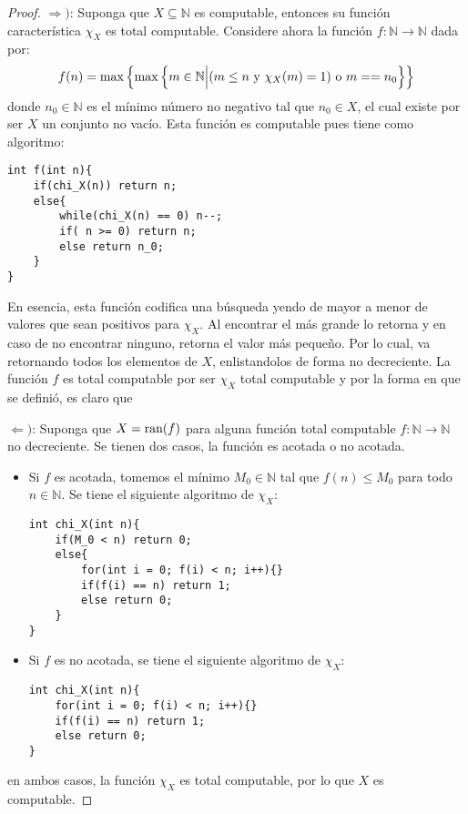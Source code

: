 \documentclass[12pt]{report}
\newcounter{it}
\theoremstyle{largebreak}
\newcommand\cf[3]{\ensuremath{#1:#2\rightarrow#3}}
\begin{document}
    \begin{proof}
        $\Rightarrow)$: Suponga que $X\subseteq\mathbb{N}$ es computable, entonces su función característica $\chi_X$ es total computable. Considere ahora la función $\cf{f}{\mathbb{N}}{\mathbb{N}}$ dada por:
        \begin{equation*}
            f(n)=\max\left\{\max\left\{m\in\mathbb{N}\Big|(m\leq n \textup{ y }\chi_X(m)=1)\textup{ o }m==n_0 \right\}\right\}
        \end{equation*}
        donde $n_0\in\mathbb{N}$ es el mínimo número no negativo tal que $n_0\in X$, el cual existe por ser $X$ un conjunto no vacío. Esta función es computable pues tiene como algoritmo:
        \begin{lstlisting}
int f(int n){
    if(chi_X(n)) return n;
    else{
        while(chi_X(n) == 0) n--;
        if( n >= 0) return n;
        else return n_0;
    }
}
        \end{lstlisting}
        En esencia, esta función codifica una búsqueda yendo de mayor a menor de valores que sean positivos para $\chi_X$. Al encontrar el más grande lo retorna y en caso de no encontrar ninguno, retorna el valor más pequeño. Por lo cual, va retornando todos los elementos de $X$, enlistandolos de forma no decreciente. La función $f$ es total computable por ser $\chi_X$ total computable y por la forma en que se definió, es claro que 

        $\Leftarrow)$: Suponga que $X=\textup{ran}(f)$ para alguna función total computable $\cf{f}{\mathbb{N}}{\mathbb{N}}$ no decreciente. Se tienen dos casos, la función es acotada o no acotada.

        \begin{itemize}
            \item Si $f$ es acotada, tomemos el mínimo $M_0\in\mathbb{N}$ tal que $f(n)\leq M_0$ para todo $n\in\mathbb{N}$. Se tiene el siguiente algoritmo de $\chi_X$:
            \begin{lstlisting}
int chi_X(int n){
    if(M_0 < n) return 0;
    else{
        for(int i = 0; f(i) < n; i++){}
        if(f(i) == n) return 1;
        else return 0;
    }
}
            \end{lstlisting}
            \item Si $f$ es no acotada, se tiene el siguiente algoritmo de $\chi_X$:
            \begin{lstlisting}
int chi_X(int n){
    for(int i = 0; f(i) < n; i++){}
    if(f(i) == n) return 1;
    else return 0;
}
            \end{lstlisting}
        \end{itemize}
        en ambos casos, la función $\chi_X$ es total computable, por lo que $X$ es computable.

    \end{proof}
\end{document}
